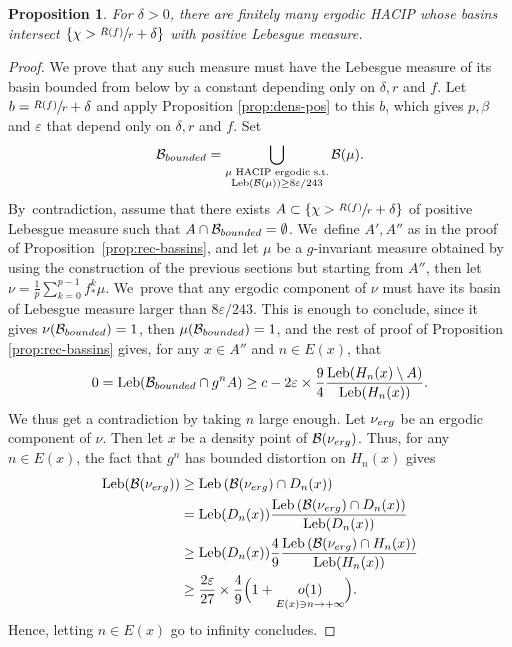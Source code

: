 \documentclass[11pt]{article}
\newcommand{\erg}{\textup{erg}}
\DeclareMathOperator{\Leb}{Leb}
\newtheorem{prop}[thm]{Proposition}
\theoremstyle{definition}
\begin{document}
\begin{prop}
\label{prop:fini}
For $\delta > 0$, there are finitely many ergodic HACIP whose basins intersect $\left \{ \chi > \sfrac{R(f)}{r} + \delta\right\}$ with positive Lebesgue measure.
\end{prop}

\begin{proof}
We prove that any such measure must have the Lebesgue measure of its basin bounded from below by a constant depending only on $\delta, r$ and $f$.
Let $b = \sfrac{R(f)}{r} + \delta$ and apply Proposition \ref{prop:dens-pos} to this $b$, which gives $p, \beta$ and $\varepsilon$ that depend only on $\delta, r$ and $f$. Set
\[
\mathcal{B}_{\textup{bounded}} = \bigcup_{
\substack{
\mu \text{ HACIP ergodic s.t.}\\
\Leb(\mathcal{B}(\mu)) \geq 8 \varepsilon / 243
}} \mathcal{B}(\mu).
\]
By~contradiction, assume that there exists $A \subset \left \{ \chi > \sfrac{R(f)}{r} + \delta\right\}$ of positive Lebesgue measure such that $A \cap \mathcal{B}_{\textup{bounded}} = \emptyset$. We~define $A', A''$ as in the proof of Proposition~\ref{prop:rec-bassins}, and let $\mu$ be a $g$-invariant measure obtained by using the construction of the previous sections but starting from $A''$, then let $\nu = \frac{1}{p}\sum_{k=0}^{p-1} f^k_* \mu$. We~prove that any ergodic component of $\nu$ must have its basin of Lebesgue measure larger than ${8 \varepsilon}/{243}$.
This is enough to conclude, since it gives $\nu(\mathcal{B}_{\textup{bounded}}) = 1$, then $\mu(\mathcal{B}_{\textup{bounded}}) = 1$, and the rest of proof of Proposition \ref{prop:rec-bassins} gives, for any $x \in A''$ and $n \in E(x)$, that
\[
0 = \Leb(\mathcal{B}_{\textup{bounded}} \cap g^n A) \geq c - 2 \varepsilon \times \frac{9}{4} \frac{\Leb(H_n(x) \setminus A)}{\Leb(H_n(x))}.
\]
We thus get a contradiction by taking $n$ large enough.
Let $\nu_{\erg}$ be an ergodic component of $\nu$.
Then let $x$ be a density point of $\mathcal{B}(\nu_{\erg})$.
Thus, for any $n \in E(x)$, the fact that $g^n$ has bounded distortion on $H_n(x)$ gives
\begin{align*}
\Leb(\mathcal{B}(\nu_{\erg})) &\geq \Leb\left (\mathcal{B}(\nu_{\erg}) \cap D_n(x) \right)\\
&= \Leb (D_n(x)) \frac{\Leb\left (\mathcal{B}(\nu_{\erg}) \cap D_n(x) \right)}{\Leb (D_n(x))}\\
&\geq \Leb (D_n(x)) \frac{4}{9} \frac{\Leb \left (\mathcal{B}(\nu_{\erg}) \cap H_n(x) \right)}{\Leb(H_n(x))}\\
&\geq \frac{2 \varepsilon}{27} \times \frac{4}{9} \Bigl (1 + \underset{E(x) \ni n\to +\infty}{o(1)} \Bigr).
\end{align*}
Hence, letting $n \in E(x)$ go to infinity concludes.
\end{proof}
\end{document}
